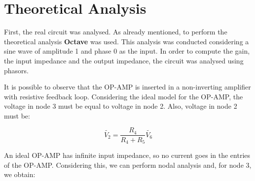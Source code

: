 \newpage
\section{Theoretical Analysis}
\label{sec:analysis}



First, the real circuit was analysed. As already mentioned, to perform the theoretical analysis {\bf Octave} was used. This analysis was conducted considering a sine wave of amplitude 1 and phase 0 as the input. In order to compute the gain, the input impedance and the output impedance, the circuit was analysed using phasors.

It is possible to observe that the OP-AMP is inserted in a non-inverting amplifier with resistive feedback loop. Considering the ideal model for the OP-AMP, the voltage in node 3 must be equal to voltage in node 2. Also, voltage in node 2 must be:

\begin{equation}
        \widetilde{V_2} = \frac{R_4}{R_4+R_5}\widetilde{V_6}
\end{equation}

An ideal OP-AMP has infinite input impedance, so no current goes in the entries of the OP-AMP. Considering this, we can perform nodal analysis and, for node 3, we obtain: 

